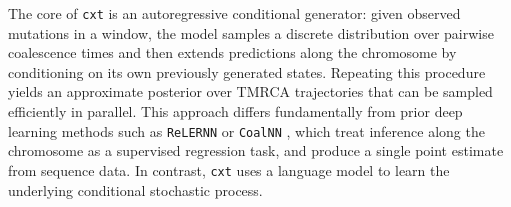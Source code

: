 \documentclass{article}
\newcommand{\cxtkit}{\texttt{cxt}\xspace}
\let\citep\parencite
\begin{document}
The core of \cxtkit is an autoregressive conditional generator:
given observed mutations in a window, the model samples a discrete distribution over pairwise coalescence times 
and then extends predictions along the chromosome by conditioning on its own previously generated states.
Repeating this procedure yields an approximate posterior over TMRCA trajectories
that can be sampled efficiently in parallel.
This approach differs fundamentally from prior deep learning methods such as \texttt{ReLERNN} \citep{adrion2020predicting} or \texttt{CoalNN} \citep{nait_saada_inference_2023}, which treat inference along the chromosome as a supervised regression task, and produce a single point estimate from sequence data.
In contrast, \cxtkit uses a language model to learn the underlying conditional stochastic process.

\end{document}

